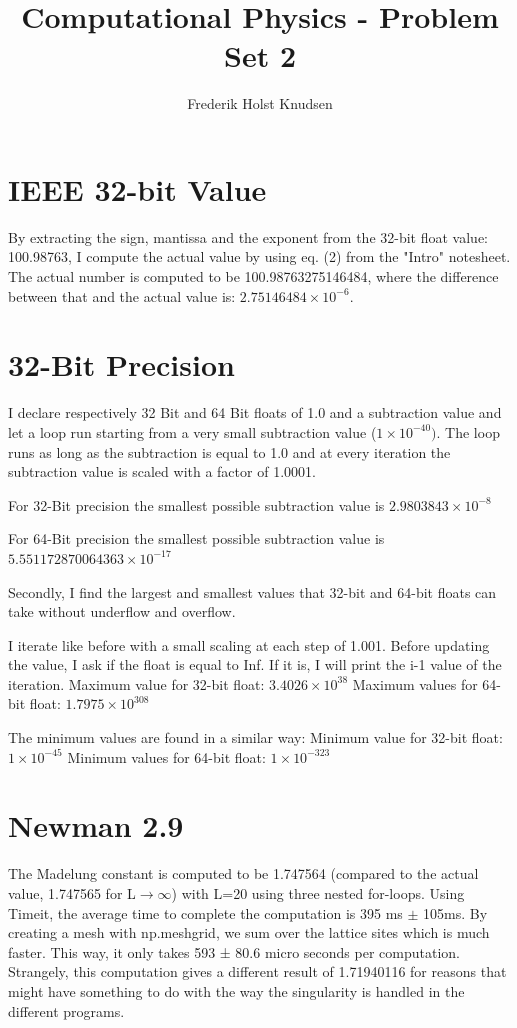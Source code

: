 \documentclass[11pt]{article}
\title{Computational Physics -  Problem Set 2}
\author{Frederik Holst Knudsen}
\begin{document}
\maketitle

\section{IEEE 32-bit Value}
\label{sec:intro}
By extracting the sign, mantissa and the exponent from the 32-bit float value: 100.98763, I compute the actual value by using eq. (2) from the "Intro" notesheet. The actual number is computed to be 100.98763275146484, where the difference between that and the actual value is: 
$2.75146484\times 10^{-6}$.

\section{32-Bit Precision}
I declare respectively 32 Bit and 64 Bit floats of 1.0 and a subtraction value and let a loop run starting from a very small subtraction value ($1\times10^{-40})$. The loop runs as long as the subtraction is equal to 1.0 and at every iteration the subtraction value is scaled with a factor of 1.0001. 

For 32-Bit precision the smallest possible subtraction value is $2.9803843\times10^{-8}$

For 64-Bit precision the smallest possible subtraction value is $5.551172870064363\times10^{-17}$


Secondly, I find the largest and smallest values that 32-bit and 64-bit floats can take without underflow and overflow. 

I iterate like before with a small scaling at each step of 1.001. Before updating the value, I ask if the float is equal to Inf. If it is, I will print the i-1 value of the iteration.
Maximum value for 32-bit float: $3.4026\times 10^{38}$ 
Maximum values for 64-bit float: $1.7975\times 10^{308}$ 

The minimum values are found in a similar way: 
Minimum value for 32-bit float: $1\times 10^{-45}$ 
Minimum values for 64-bit float: $1\times 10^{-323}$ 


\section{Newman 2.9}
The Madelung constant is computed to be 1.747564 (compared to the actual value, 1.747565 for L$\to\infty$) with L=20 using three nested for-loops. Using Timeit, the average time to complete the computation is 395 ms $\pm$ 105ms. By creating a mesh with np.meshgrid, we sum over the lattice sites which is much faster. This way, it only takes 593 ± 80.6 micro seconds per computation. Strangely, this computation gives a different result of 1.71940116 for reasons that might have something to do with the way the singularity is handled in the different programs. 
\end{document}
